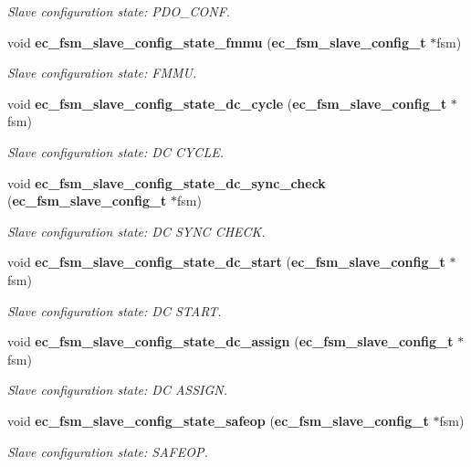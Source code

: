 \begin{DoxyCompactItemize}
\begin{DoxyCompactList}\small\item\em \-Slave configuration state\-: \-P\-D\-O\-\_\-\-C\-O\-N\-F. \end{DoxyCompactList}\item 
void {\bf ec\-\_\-fsm\-\_\-slave\-\_\-config\-\_\-state\-\_\-fmmu} ({\bf ec\-\_\-fsm\-\_\-slave\-\_\-config\-\_\-t} $\ast$fsm)
\begin{DoxyCompactList}\small\item\em \-Slave configuration state\-: \-F\-M\-M\-U. \end{DoxyCompactList}\item 
void {\bf ec\-\_\-fsm\-\_\-slave\-\_\-config\-\_\-state\-\_\-dc\-\_\-cycle} ({\bf ec\-\_\-fsm\-\_\-slave\-\_\-config\-\_\-t} $\ast$fsm)
\begin{DoxyCompactList}\small\item\em \-Slave configuration state\-: \-D\-C \-C\-Y\-C\-L\-E. \end{DoxyCompactList}\item 
void {\bf ec\-\_\-fsm\-\_\-slave\-\_\-config\-\_\-state\-\_\-dc\-\_\-sync\-\_\-check} ({\bf ec\-\_\-fsm\-\_\-slave\-\_\-config\-\_\-t} $\ast$fsm)
\begin{DoxyCompactList}\small\item\em \-Slave configuration state\-: \-D\-C \-S\-Y\-N\-C \-C\-H\-E\-C\-K. \end{DoxyCompactList}\item 
void {\bf ec\-\_\-fsm\-\_\-slave\-\_\-config\-\_\-state\-\_\-dc\-\_\-start} ({\bf ec\-\_\-fsm\-\_\-slave\-\_\-config\-\_\-t} $\ast$fsm)
\begin{DoxyCompactList}\small\item\em \-Slave configuration state\-: \-D\-C \-S\-T\-A\-R\-T. \end{DoxyCompactList}\item 
void {\bf ec\-\_\-fsm\-\_\-slave\-\_\-config\-\_\-state\-\_\-dc\-\_\-assign} ({\bf ec\-\_\-fsm\-\_\-slave\-\_\-config\-\_\-t} $\ast$fsm)
\begin{DoxyCompactList}\small\item\em \-Slave configuration state\-: \-D\-C \-A\-S\-S\-I\-G\-N. \end{DoxyCompactList}\item 
void {\bf ec\-\_\-fsm\-\_\-slave\-\_\-config\-\_\-state\-\_\-safeop} ({\bf ec\-\_\-fsm\-\_\-slave\-\_\-config\-\_\-t} $\ast$fsm)
\begin{DoxyCompactList}\small\item\em \-Slave configuration state\-: \-S\-A\-F\-E\-O\-P. \end{DoxyCompactList}\item 

\end{DoxyCompactItemize}
